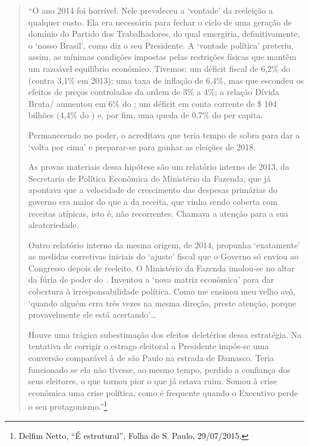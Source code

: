 \begin{quote}
``O ano 2014 foi horrível. Nele prevaleceu a `vontade' da reeleição a
qualquer custo. Ela era necessária para fechar o ciclo de uma geração de
domínio do Partido dos Trabalhadores, do qual emergiria,
definitivamente, o `nosso Brasil', como diz o seu Presidente. A `vontade
política' preteriu, assim, as mínimas condições impostas pelas
restrições físicas que mantêm um razoável equilíbrio econômico. Tivemos:
um déficit fiscal de 6,2\% do  (contra 3,1\% em 2013); uma taxa de
inflação de 6,4\%, mas que escondeu os efeitos de preços controlados da
ordem de 3\% a 4\%; a relação Dívida Bruta/  aumentou em 6\% do ;
um déficit em conta corrente de \$ 104 bilhões (4,4\% do ) e, por
fim, uma queda de 0,7\% do  per capita.

Permanecendo no poder, o  acreditava que teria tempo de sobra para dar
a `volta por cima' e preparar-se para ganhar as eleições de 2018.

As provas materiais dessa hipótese são um relatório interno de 2013, da
Secretaria de Política Econômica do Ministério da Fazenda, que já
apontava que a velocidade de crescimento das despesas primárias do
governo era maior do que a da receita, que vinha sendo coberta com
receitas atípicas, isto é, não recorrentes. Chamava a atenção para a sua
aleatoriedade.

Outro relatório interno da mesma origem, de 2014, propunha `exatamente'
as medidas corretivas iniciais do `ajuste' fiscal que o Governo só
enviou ao Congresso depois de reeleito. O Ministério da Fazenda
imolou-se no altar da fúria de poder do . Inventou a `nova matriz
econômica' para dar cobertura à irresponsabilidade política. Como me
ensinou meu velho avô, `quando alguém erra três vezes na mesma direção,
preste atenção, porque provavelmente ele está acertando'…

Houve uma trágica subestimação dos efeitos deletérios dessa estratégia.
Na tentativa de corrigir o estrago eleitoral a Presidente impôs-se uma
conversão comparável à de são Paulo na estrada de Damasco. Teria
funcionado se ela não tivesse, ao mesmo tempo, perdido a confiança dos
seus eleitores, o que tornou pior o que já estava ruim. Somou à crise
econômica uma crise política, como é frequente quando o Executivo perde
o seu protagonismo.''\footnote{Delfim Netto, ``É estrutural'', Folha de
  S. Paulo, 29/07/2015.}
\end{quote}

